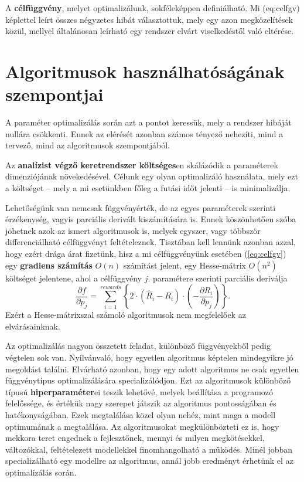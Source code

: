 A \textbf{célfüggvény}, melyet optimalizálunk, sokféleképpen definiálható. Mi \aref({eq:celfgv}) képlettel leírt összes négyzetes hibát választottuk, mely egy azon megközelítések közül, mellyel általánosan leírható egy rendszer elvárt viselkedéstől való eltérése.

\section{Algoritmusok használhatóságának szempontjai}

A paraméter optimalizálás során azt a pontot keressük, mely a rendszer hibáját nullára csökkenti. Ennek az elérését azonban számos tényező nehezíti, mind a tervező, mind az algoritmusok szempontjából.

Az \textbf{analízist végző keretrendszer költséges}en skálázódik a paraméterek dimenziójának növekedésével. Célunk egy olyan optimalizáló használata, mely ezt a költséget -- mely a mi esetünkben főleg a futási időt jelenti -- is minimalizálja.

Lehetőségünk van nemcsak függvényérték, de az egyes paraméterek szerinti érzékenység, vagyis parciális derivált kiszámítására is. Ennek köszönhetően szóba jöhetnek azok az ismert algoritmusok is, melyek egyszer, vagy többször differenciálható célfüggvényt feltételeznek. Tisztában kell lennünk azonban azzal, hogy ezért drága árat fizetünk, hisz a mi célfüggvényünk esetében (\ref{eq:celfgv}) egy \textbf{gradiens számítás} $O(n)$ számítást jelent, egy Hesse-mátrix $O(n^2)$ költséget jelentene, ahol a célfüggvény $j.$ paramétere szerinti parciális deriválja
$$\frac{\partial f}{\partial p_j}=\sum_{i=1}^{rewards}\left\lbrace   2\cdot \left( \hat{R}_i-R_i\right) \cdot\left(-\frac{\partial R_i}{\partial p_j}\right)  \right\rbrace   .$$
Ezért a Hesse-mátrixszal számoló algoritmusok nem megfelelőek az elvárásainknak.

Az optimalizálás nagyon összetett feladat, különböző függvényekből pedig végtelen sok van. Nyilvánvaló, hogy egyetlen algoritmus képtelen mindegyikre jó megoldást találni. Elvárható azonban, hogy egy adott algoritmus ne csak egyetlen függvénytípus optimalizálására specializálódjon. Ezt az algoritmusok különböző típusú \textbf{hiperparaméter}ei teszik lehetővé, melyek beállítása a programozó felelőssége, és értékük nagy szerepet játszik az algoritmus pontosságában és hatékonyságában. Ezek megtalálása közel olyan nehéz, mint maga a modell optimumának a megtalálása. Az algoritmusokat megkülönbözteti ez is, hogy mekkora teret engednek a fejlesztőnek, mennyi és milyen megkötésekkel, változókkal, feltételezett modellekkel finomhangolható a működés. Minél jobban specializálható egy modellre az algoritmus, annál jobb eredményt érhetünk el az optimalizálás során.

